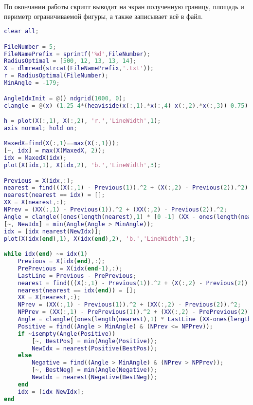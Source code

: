 По окончании работы скрипт выводит на экран полученную границу, площадь и периметр ограничиваемой фигуры, а также записывает всё в файл.
\newpage
 \newpage
\newpage
{}

\begin{lstlisting}[language=matlab, frame=lines]
clear all;

FileNumber = 5;
FileNamePrefix = sprintf('%d',FileNumber);
RadiusOptimal = [500, 12, 13, 13, 14];
X = dlmread(strcat(FileNamePrefix,'.txt'));
r = RadiusOptimal(FileNumber);
MinAngle = -179;

AngleIdxInit = @() ndgrid(1000, 0);
clangle = @(x) (1.25-4*(heaviside(x(:,1).*x(:,4)-x(:,2).*x(:,3))-0.75).^2) .*acos((x(:,1).*x(:,3)+x(:,2).*x(:,4))./sqrt((x(:,1).^2+ x(:,2).^2) .*(x(:,3).^2+ x(:,4).^2)))*180/pi;

h = plot(X(:,1), X(:,2), 'r.','LineWidth',1);
axis normal; hold on;

MaxedX=find(X(:,1)==max(X(:,1)));
[~, idx] = max(X(MaxedX, 2));
idx = MaxedX(idx);
plot(X(idx,1), X(idx,2), 'b.','LineWidth',3);

Previous = X(idx,:);
nearest = find(((X(:,1) - Previous(1)).^2 + (X(:,2) - Previous(2)).^2) < r^2);
nearest(nearest == idx) = [];
XX = X(nearest,:);
NPrev = (XX(:,1) - Previous(1)).^2 + (XX(:,2) - Previous(2)).^2;
Angle = clangle([ones(length(nearest),1) * [0 -1] (XX - ones(length(nearest),1) * Previous)]);
[~, NewIdx] = min(Angle(Angle > MinAngle));
idx = [idx nearest(NewIdx)];
plot(X(idx(end),1), X(idx(end),2), 'b.','LineWidth',3);

while idx(end) ~= idx(1)
    Previous = X(idx(end),:);
    PrePrevious = X(idx(end-1),:);
    LastLine = Previous - PrePrevious;
    nearest = find(((X(:,1) - Previous(1)).^2 + (X(:,2) - Previous(2)).^2) < r^2);
    nearest(nearest == idx(end)) = [];
    XX = X(nearest,:);
    NPrev = (XX(:,1) - Previous(1)).^2 + (XX(:,2) - Previous(2)).^2;
    NPPrev = (XX(:,1) - PrePrevious(1)).^2 + (XX(:,2) - PrePrevious(2)).^2;
    Angle = clangle([ones(length(nearest),1) * LastLine (XX-ones(length(nearest),1)*Previous) ] );
    Positive = find((Angle > MinAngle) & (NPrev <= NPPrev));
    if ~isempty(Angle(Positive))
        [~, BestPos] = min(Angle(Positive));
        NewIdx = nearest(Positive(BestPos));
    else
        Negative = find((Angle > MinAngle) & (NPrev > NPPrev));
        [~, BestNeg] = min(Angle(Negative));
        NewIdx = nearest(Negative(BestNeg));
    end
    idx = [idx NewIdx];
end


\end{lstlisting}
